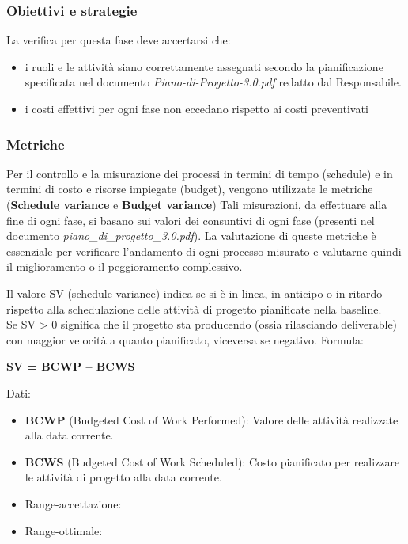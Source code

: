 \documentclass[a4paper,11pt]{article}
\begin{document}
\subsubsection{Obiettivi e strategie}
La verifica per questa fase deve accertarsi che:
\begin{itemize}
\item i ruoli e le attività siano correttamente assegnati secondo la pianificazione specificata nel documento \textit{Piano-di-Progetto-3.0.pdf} redatto dal Responsabile.
\item i costi effettivi per ogni fase non eccedano rispetto ai costi preventivati
\end{itemize}
\subsubsection{Metriche}
Per il controllo e la misurazione dei processi in termini di tempo (schedule) e in termini di costo e risorse impiegate (budget), vengono utilizzate le metriche (\textbf{Schedule variance} e \textbf{Budget variance}) 
Tali misurazioni, da effettuare alla fine di ogni fase, si basano sui valori dei consuntivi di ogni fase (presenti nel documento \textit{piano\_di\_progetto\_3.0.pdf}). La valutazione di queste metriche è essenziale per verificare l'andamento di ogni processo misurato e valutarne quindi il miglioramento o il peggioramento complessivo.

Il valore SV (schedule variance) indica se si è in linea, in anticipo o in ritardo rispetto alla schedulazione delle attività di progetto pianificate nella baseline.\\
Se SV > 0 significa che il progetto sta producendo (ossia rilasciando deliverable) con maggior velocità a quanto pianificato, viceversa se negativo.
Formula:
\begin{center}
\textbf{SV = BCWP – BCWS\\}
\end{center}
Dati:
\begin{itemize}
\item \textbf{BCWP} (Budgeted Cost of Work Performed): Valore delle attività realizzate alla data corrente.
\item \textbf{BCWS} (Budgeted Cost of Work Scheduled): Costo pianificato per realizzare le attività di progetto alla data corrente.
\end{itemize}
\begin{itemize}
	\item Range-accettazione: \begin{math} [ \ge -(PreventivoFase*5\%)]
	\end{math}
	\item Range-ottimale: \begin{math}[ \ge 0]\end{math}
	\end{itemize}
\end{document}
